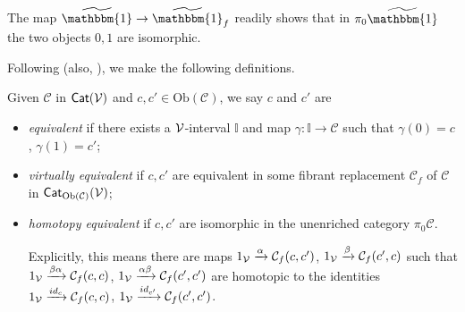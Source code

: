 \documentclass[a4paper,10pt
,draft
]{article}%
\renewcommand{\1}{\eta}%
\begin{document}
\begin{remark}
The map $\widetilde{\mathbbm{1}} \to \widetilde{\mathbbm{1}}_f$
readily shows that in $\pi_0 \widetilde{\mathbbm{1}}$
the two objects $0,1$ are isomorphic.
\end{remark}




Following \cite[Def. 2.6]{BM13} (also, \cite{Cav}),
we make the following definitions.

\begin{definition}\label{EQUIV_DEF}
	Given $\mathcal{C}$ in  $\mathsf{Cat}(\mathcal V)$ and $c,c'\in\mathrm{Ob}(\mathcal C)$, we say $c$ and $c'$ are
\begin{itemize}
	\item {\em equivalent} if there exists a $\mathcal V$-interval $\mathbb{I}$
	and map $\gamma: \mathbb{I} \to \mathcal C$ such that
	$\gamma(0)= c$, $\gamma(1)= c'$;
	\item {\em virtually equivalent} if $c,c'$ are equivalent in some fibrant replacement
	$\mathcal C_f$ of $\mathcal C$ in $\mathsf{Cat}_{\mathrm{Ob}(\mathcal C)}(\mathcal V)$;
	\item {\em homotopy equivalent} if $c,c'$ are isomorphic in the unenriched category $\pi_0 \mathcal C$.

	Explicitly, this means there are maps 
	$1_{\mathcal V} \xrightarrow{\alpha} \mathcal C_f(c,c')$, 
	$1_{\mathcal V} \xrightarrow{\beta} \mathcal C_f(c',c)$ such that
	$1_{\mathcal V} \xrightarrow{\beta \alpha} \mathcal C_f(c,c)$,
	$1_{\mathcal V} \xrightarrow{\alpha \beta} \mathcal C_f(c',c')$
	are homotopic to the identities
	$1_{\mathcal V} \xrightarrow{id_c} \mathcal C_f(c,c)$,
	$1_{\mathcal V} \xrightarrow{id_{c'}} \mathcal C_f(c',c')$.
\end{itemize}
\end{definition}
\end{document}
